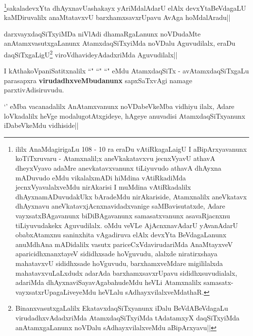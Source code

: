 
\begin{artha}
\footnote[1]{ililx AnaMdagirigaLu 108 - 10 ra eraDu vAtiRkagaLaigU I aBipArxyavanunx koTiTxruvaru - Atamxnalil;x aneVkakatavxvu jecnxVyavU athavA dheyxVyavo adaMre anevkatavxvanunx tiLiyuvudo athavA dhAyxna mADuvudo eMdu vikalalxmADi hiMdina vAtiRkadiMda jecnxVyavalalxveMdu nirAkarisi I muMdina vAtiRkadalilx dhAyxnamADuvudakUkx bAradeMdu nirAkariside, Atamxnalilx aneVkatavx dhAyxnavu aneVkatavxjAcnxnavidadxvanige saMBavisutatxde, Adare vayxsatxBAgavanunx biDiBAgavanunx samasatxvanunx asavaRjacnxnu tiLiyuvudakekx Aguvudilalx. oMdu veVLe AjAcnxnavAdarU yAvanAdarU obabxAtamxnu saninxhita vAgadiruva elAlx devxYta BeVdagaLanunx anuMdhAna mADidalilx vasutx pariceCxVdavirudariMda AnaMtayxveV aparicidhxnanxtayeV sididhxsade hoVguvudu, alalxde niratirxshaya mahatavxvU sididhxsade hoVguvudu, barxhamxveMdare migililalxda mahatavxvuLaLxdudx adarAda barxhamxsavxrUpavu sididhxsuvudialalx, adariMda dhAyxnaviSayavAgabahudeMdu heVLi Atamxnalilx samasatx-vayxsatxrUpagaLiveyeMdu heVLalu sAdhayxvilalxveMdathaR.}sakaladevxYta dhAyxnavUashakayx yAriMdalAdarU elAlx devxYtaBeVdagaLU kaMDiruvalilx anaMtatavxvU barxhamxsavxrUpavu AvAga hoMdalAradu||
\end{artha}

\begin{artha}
darxvayxdaqSiTxyiMDa niVlAdi dhamaRgaLanunx noVDudaMte anAtamxvasutxgaLanunx AtamxdaqSiTxyiMda noVDalu Aguvudilalx, eraDu daqSiTxgaLigU\footnote[2]{BinanxvasutxgaLalilx EkatavxdaqSiTxyanunx iDalu BeVdABeVdagaLu virudadhxvAdadxriMda AtamxdaqSiTxyiMda tAdatamxyX daqSiTxyiMda anAtamxgaLanunx noVDalu sAdhayxvilalxveMdu aBipArxyavu||} viroVdhavideyAdadxriMda Aguvudilalx||
\end{artha}


\begin{artha}
I kAthakoVpaniSatitxnalilx ``\stext" ``\stext" ``\stext" eMdu AtamxdaqSiTx - avAtamxdaqSiTxgaLu parasapxra \textbf{virudadhxveMbudanunx} sapxSaTxvAgi namage parxtivAdisiruvudu.
\end{artha}


`\stext' eMba vacanadalilx AnAtamxvanunx noVDabeVkeMba vidhiyu ilalx, Adare loVkadalilx heVge modalugotAtxgideye, hAgeye anuvadisi AtamxdaqSiTxyanunx iDabeVkeMdu vidhiside||

